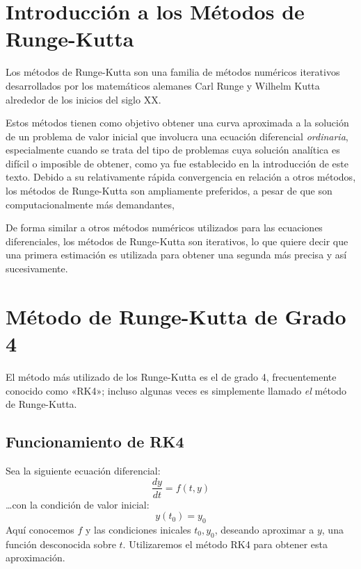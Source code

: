 \documentclass[12pt, a4paper]{article}
\begin{document}
\section{Introducción a los Métodos de Runge-Kutta}

Los métodos de Runge-Kutta son una familia de métodos numéricos iterativos desarrollados por los matemáticos alemanes Carl Runge y Wilhelm Kutta alrededor de los inicios del siglo XX.\@

Estos métodos tienen como objetivo obtener una curva aproximada a la solución de un problema de valor inicial que involucra una ecuación diferencial \textit{ordinaria}, especialmente cuando se trata del tipo de problemas cuya solución analítica es difícil o imposible de obtener, como ya fue establecido en la introducción de este texto. Debido a su relativamente rápida convergencia en relación a otros métodos, los métodos de Runge-Kutta son ampliamente preferidos, a pesar de que son computacionalmente más demandantes,

De forma similar a otros métodos numéricos utilizados para las ecuaciones diferenciales, los métodos de Runge-Kutta son iterativos, lo que quiere decir que una primera estimación es utilizada para obtener una segunda más precisa y así sucesivamente.

\section{Método de Runge-Kutta de Grado 4}

El método más utilizado de los Runge-Kutta es el de grado 4, frecuentemente conocido como «RK4»; incluso algunas veces es simplemente llamado \textit{el} método de Runge-Kutta.

\subsection{Funcionamiento de RK4}\label{sect:def-rk4}

Sea la siguiente ecuación diferencial:
\begin{equation} \label{eq:main-diff-eq}
	\frac{dy}{dt} = f(t,y)
\end{equation}
…con la condición de valor inicial:
\begin{equation*}
	y(t_0) = y_0
\end{equation*}
Aquí conocemos \(f\) y las condiciones inicales \(t_0, y_0\), deseando aproximar a \(y\), una función desconocida sobre \(t\). Utilizaremos el método RK4 para obtener esta aproximación.
\end{document}
